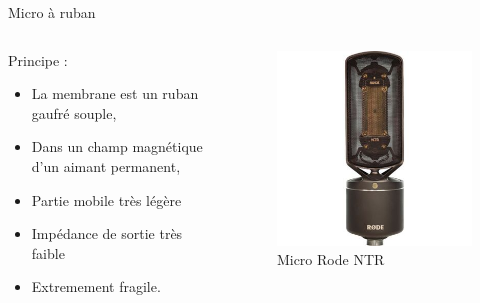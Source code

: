 \documentclass[aspectratio=169]{beamer}
\begin{document}
\begin{frame}{Micro à ruban}
\begin{columns}[t]\small
  \begin{column}{.5\textwidth}
Principe :
\begin{itemize}
	\item La membrane est un ruban gaufré souple, 
	\item Dans un champ magnétique d'un aimant permanent,
	\item Partie mobile très légère
	\item Impédance de sortie très faible 
	\item Extremement fragile.
\end{itemize}
  \end{column}
  \begin{column}{.5\textwidth}
	\begin{figure}[!h]
	\begin{center}
	\includegraphics[width=.8\textwidth]{figure/ntr02.jpg}
	\end{center}
	\caption{Micro Rode NTR}
	\end{figure}
  \end{column}
\end{columns}

\end{frame}
\end{document}
